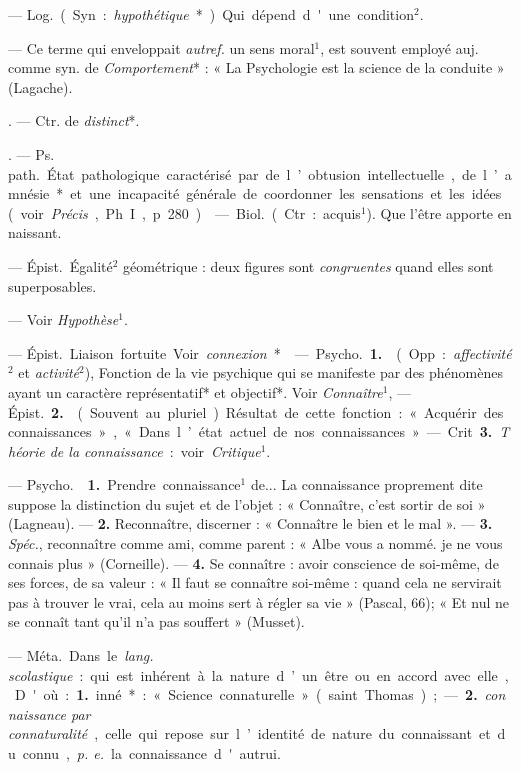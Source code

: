 \begin{itemize}[leftmargin=1cm, label=, itemsep=11pt]
 — \si{Log.} (Syn. : {\it hypothétique}*). Qui dépend d'une condition$^2$.

 — Ce terme qui enveloppait
{\it autref.} un sens moral$^1$, est souvent
employé auj. comme syn. de {\it Comportement}* : « La Psychologie est la
science de la conduite » (Lagache).

. — Ctr. de {\it distinct}*.

. — \si{Ps. path.} État
pathologique caractérisé par de
l’obtusion intellectuelle, de l’amnésie* et une incapacité générale de
coordonner les sensations et les
idées (voir  {\it Précis}, Ph. I, p. 280).

 — \si{Biol.} (Ctr. : acquis$^1$).
Que l’être apporte en naissant.

 — \si{Épist.} Égalité$^2$ géométrique : deux figures sont {\it congruentes} quand elles sont superposables.

 — Voir {\it Hypothèse}$^1$.

 — \si{Épist.} Liaison fortuite. Voir {\it connexion}*.

 — \si{Psycho.} {\bf 1.}  (Opp. :
{\it affectivité}$^2$ et {\it activité}$^2$), Fonction de
la vie psychique qui se manifeste
par des phénomènes ayant un caractère représentatif* et objectif*. Voir
{\it Connaître}$^1$, — \si{Épist.} {\bf 2.}  (Souvent
au pluriel). Résultat de cette fonction : « Acquérir des connaissances »,
« Dans l’état actuel de nos connaissances ».

— Crit. {\bf 3.} {\it Théorie de la connaissance} : voir {\it Critique}$^1$.

 — \si{Psycho.}  {\bf 1.} Prendre
connaissance$^1$ de... La connaissance
proprement dite suppose la distinction du sujet et de l’objet : « Connaître, c’est sortir de soi » (Lagneau).
— {\bf 2.} Reconnaître, discerner :
« Connaître le bien et le mal ». —
 {\bf 3.} {\it Spéc.}, reconnaître comme ami,
comme parent : « Albe vous a nommé.
je ne vous connais plus » (Corneille).
—  {\bf 4.} Se connaître : avoir conscience de soi-même, de ses forces,
de sa valeur : « Il faut se connaître
soi-même : quand cela ne servirait
pas à trouver le vrai, cela au moins
sert à régler sa vie » (Pascal, 66); « Et
nul ne se connaît tant qu'il n’a pas
souffert » (Musset).

 — \si{Méta.} Dans le {\it lang.
scolastique} : qui est inhérent à la
nature d’un être ou en accord avec
elle, D'où : {\bf 1.} inné* : « Science connaturelle » (saint Thomas) ; — {\bf 2.} {\it connaissance par connaturalité}, celle
qui repose sur l’identité de nature
du connaissant et du connu, {\it p. e.} la
connaissance d'autrui.


\end{itemize}
